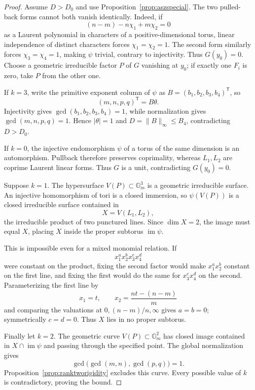 \documentclass[11pt]{article}
\theoremstyle{definition}
\begin{document}
\begin{proof}
Assume \(D>D_0\) and use Proposition~\ref{prop:aszspecial}.  The two
pulled-back forms cannot both vanish identically.  Indeed, if
\[
 (n-m)-n\chi_1+m\chi_2=0
\]
as a Laurent polynomial in characters of a positive-dimensional torus,
linear independence of distinct characters forces
\(\chi_1=\chi_2=1\).  The second form similarly forces
\(\chi_3=\chi_4=1\), making \(\psi\) trivial, contrary to injectivity.
Thus \(G(y_0)=0\).  Choose a geometric irreducible factor \(P\) of \(G\)
vanishing at \(y_0\); if exactly one \(F_i\) is zero, take \(P\) from the
other one.

If \(k=3\), write the primitive exponent column of \(\psi\) as
\(B=(b_1,b_2,b_3,b_4)^{\mathsf T}\), so
\[
 (m,n,p,q)^{\mathsf T}=B\theta.
\]
Injectivity gives \(\gcd(b_1,b_2,b_3,b_4)=1\), while normalization gives
\(\gcd(m,n,p,q)=1\).  Hence \(|\theta|=1\) and
\(D=\|B\|_\infty\leq B_4\), contradicting \(D>D_0\).

If \(k=0\), the injective endomorphism \(\psi\) of a torus of the same
dimension is an automorphism.  Pullback therefore preserves coprimality,
whereas \(L_1,L_2\) are coprime Laurent linear forms.  Thus \(G\) is a
unit, contradicting \(G(y_0)=0\).

Suppose \(k=1\).  The hypersurface \(V(P)\subset\mathbb G_m^3\) is a
geometric irreducible surface.  An injective homomorphism of tori is a closed
immersion, so \(\psi(V(P))\) is a closed irreducible surface contained in
\[
 X=V(L_1,L_2),
\]
the irreducible product of two punctured lines.  Since \(\dim X=2\), the
image must equal \(X\), placing \(X\) inside the proper subtorus
\(\operatorname{im}\psi\).

This is impossible even for a mixed monomial relation.  If
\[
 x_1^a x_2^b x_3^c x_4^d
\]
were constant on the product, fixing the second factor would make
\(x_1^a x_2^b\) constant on the first line, and fixing the first would do
the same for \(x_3^c x_4^d\) on the second.  Parameterizing the first line
by
\[
 x_1=t,
 \qquad x_2=\frac{nt-(n-m)}m
\]
and comparing the valuations at \(0,(n-m)/n,\infty\) gives \(a=b=0\);
symmetrically \(c=d=0\).  Thus \(X\) lies in no proper subtorus.

Finally let \(k=2\).  The geometric curve \(V(P)\subset\mathbb G_m^2\)
has closed image contained in
\(X\cap\operatorname{im}\psi\) and passing through the specified point.
The global normalization gives
\[
 \gcd\bigl(\gcd(m,n),\gcd(p,q)\bigr)=1.
\]
Proposition~\ref{prop:ranktworigidity} excludes this curve.  Every possible
value of \(k\) is contradictory, proving the bound.
\end{proof}
\end{document}
